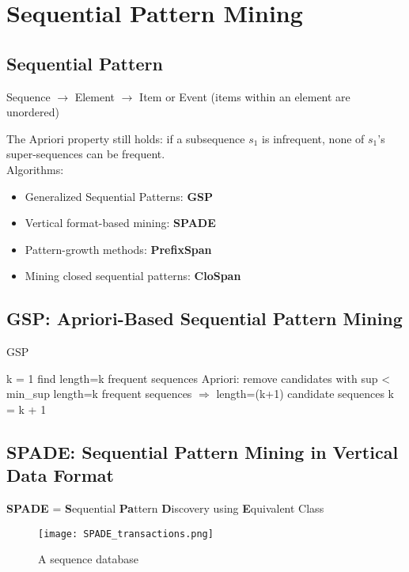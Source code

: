 \section{Sequential Pattern Mining}

\subsection{Sequential Pattern}
Sequence $\to$ Element $\to$ Item or Event (items within an element are unordered)

The Apriori property still holds: if a subsequence $s_1$ is infrequent, none of $s_1$’s super-sequences can be frequent.\\

Algorithms:
\begin{itemize}
\item Generalized Sequential Patterns: \textbf{GSP}
\item Vertical format-based mining: \textbf{SPADE}
\item Pattern-growth methods: \textbf{PrefixSpan}
\item Mining closed sequential patterns: \textbf{CloSpan}
\end{itemize}


\subsection{GSP: Apriori-Based Sequential Pattern Mining}

\begin{algorithm}
\caption{GSP}
\begin{algorithmic}
\State k = 1
\Repeat
    \State find length=k frequent sequences
    \State Apriori: remove candidates with sup < min\_sup
    \State length=k frequent sequences $\Rightarrow$ length=(k+1) candidate sequences
    \State k = k + 1
\end{algorithmic}
\end{algorithm}


\subsection{SPADE: Sequential Pattern Mining in Vertical Data Format}
\textbf{SPADE} = \textbf{S}equential \textbf{Pa}ttern \textbf{D}iscovery using \textbf{E}quivalent Class

\begin{figure}[H]
    \centering
    \texttt{[image: SPADE\_transactions.png]}
    \caption{A sequence database}
\end{figure}

